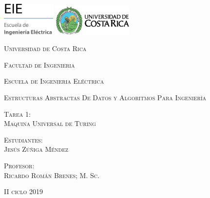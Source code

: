 \begin{titlepage}
		\bf
		\centering
		\includegraphics[width=0.20\textwidth]{images/EIE.png}			
		\hspace{7cm} 
		\includegraphics[width=0.30\textwidth]{images/UCR.png}	
		\par
		\vspace{1cm}			
		{\scshape\large Universidad de Costa Rica \par}
		\vspace{0.6cm}
		{\scshape\large Facultad de Ingenieria\par}
		\vspace{0.6cm}
		{\scshape\large Escuela de Ingenieria Eléctrica\par}
		\vspace{0.6cm}
		{\scshape\large Estructuras Abstractas De Datos y Algoritmos Para Ingeniería   \par}
		\vspace{1cm}		
		{\scshape\large Tarea 1:\\ Maquina Universal de Turing \par}
		\vspace{2cm}		
		{\scshape\large Estudiantes:\\ Jesús Zúñiga Méndez \\ \par}
		\vspace{2cm}		
		{\scshape\large Profesor:\\ Ricardo Román Brenes; M. Sc. \par}
		\vspace{2cm}
		{\scshape\large II ciclo 2019 \par}
\end{titlepage}
